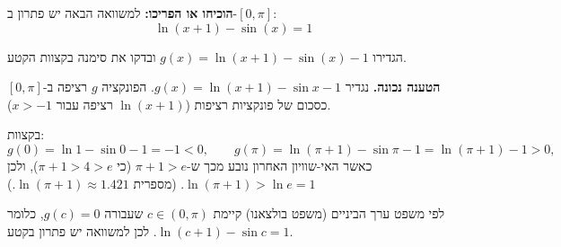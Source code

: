 
\begin{question}
\textbf{הוכיחו או הפריכו:} למשוואה הבאה יש פתרון ב-$[0,\pi]$:
\[ \ln(x+1)-\sin(x)=1 \]
\end{question}

\begin{hint}
הגדירו $g(x)=\ln(x+1)-\sin(x)-1$ ובדקו את סימנה בקצוות הקטע.
\end{hint}

\begin{solution}
\textbf{הטענה נכונה.} נגדיר $g(x)=\ln(x+1)-\sin x-1$. הפונקציה $g$ רציפה ב-$[0,\pi]$ כסכום של פונקציות רציפות ($\ln(x+1)$ רציפה עבור $x>-1$).

בקצוות:
\[ g(0)=\ln1-\sin0-1=-1<0,\qquad g(\pi)=\ln(\pi+1)-\sin\pi-1=\ln(\pi+1)-1>0, \]
כאשר האי-שוויון האחרון נובע מכך ש-$\pi+1>e$ (כי $\pi+1>4>e$), ולכן $\ln(\pi+1)>\ln e=1$. (מספרית $\ln(\pi+1)\approx1.421$.)

לפי משפט ערך הביניים (משפט בולצאנו) קיימת $c\in(0,\pi)$ שעבורה $g(c)=0$, כלומר $\ln(c+1)-\sin c=1$. לכן למשוואה יש פתרון בקטע.
\end{solution}
